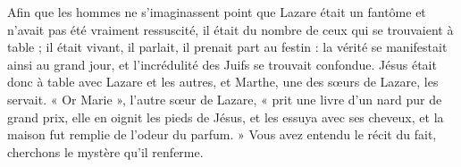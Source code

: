  Afin que les hommes ne s’imaginassent point que Lazare était un fantôme et n’avait pas été vraiment ressuscité, il était du nombre de ceux qui se trouvaient à table ; il était vivant, il parlait, il prenait part au festin : la vérité se manifestait ainsi au grand jour, et l’incrédulité des Juifs se trouvait confondue. Jésus était donc à table avec Lazare et les autres, et Marthe, une des sœurs de Lazare, les servait. « Or Marie », l’autre sœur de Lazare, « prit une livre d’un nard pur de grand prix, elle en oignit les pieds de Jésus, et les essuya avec ses cheveux, et la maison fut remplie de l’odeur du parfum. » Vous avez entendu le récit du fait, cherchons le mystère qu’il renferme.